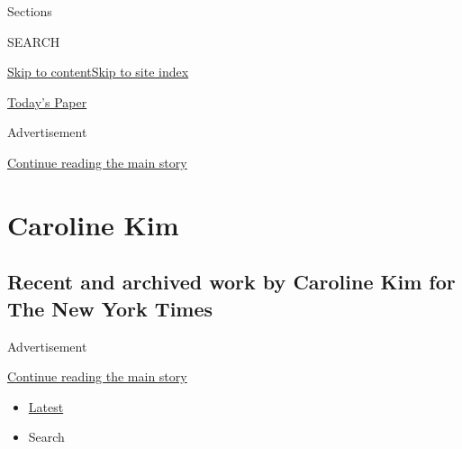 Sections

SEARCH

\protect\hyperlink{site-content}{Skip to
content}\protect\hyperlink{site-index}{Skip to site index}

\href{https://myaccount.nytimes3xbfgragh.onion/auth/login?response_type=cookie\&client_id=vi}{}

\href{https://www.nytimes3xbfgragh.onion/section/todayspaper}{Today's
Paper}

Advertisement

\protect\hyperlink{after-top}{Continue reading the main story}

\hypertarget{caroline-kim}{%
\section{Caroline Kim}\label{caroline-kim}}

\hypertarget{recent-and-archived-work-by-caroline-kim-for-the-new-york-times}{%
\subsection{Recent and archived work by Caroline Kim for The New York
Times}\label{recent-and-archived-work-by-caroline-kim-for-the-new-york-times}}

Advertisement

\protect\hyperlink{after-mid1}{Continue reading the main story}

\begin{itemize}
\tightlist
\item
  \protect\hyperlink{stream-panel}{Latest}
\item
  Search
\end{itemize}


